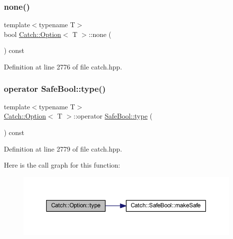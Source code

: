 \subsubsection{\texorpdfstring{none()}{none()}}
{\footnotesize\ttfamily template$<$typename T$>$ \\
bool \hyperlink{class_catch_1_1_option}{Catch\+::\+Option}$<$ T $>$\+::none (\begin{DoxyParamCaption}{ }\end{DoxyParamCaption}) const\hspace{0.3cm}{\ttfamily [inline]}}



Definition at line 2776 of file catch.\+hpp.

\hypertarget{class_catch_1_1_option_a8ed8de7b072f893c85df14913dbbe197}{}\label{class_catch_1_1_option_a8ed8de7b072f893c85df14913dbbe197} 
\subsubsection{\texorpdfstring{operator Safe\+Bool\+::type()}{operator SafeBool::type()}}
{\footnotesize\ttfamily template$<$typename T$>$ \\
\hyperlink{class_catch_1_1_option}{Catch\+::\+Option}$<$ T $>$\+::operator \hyperlink{class_catch_1_1_safe_bool_a39eef9baed296299d625a54d54a2a958}{Safe\+Bool\+::type} (\begin{DoxyParamCaption}{ }\end{DoxyParamCaption}) const\hspace{0.3cm}{\ttfamily [inline]}}



Definition at line 2779 of file catch.\+hpp.

Here is the call graph for this function\+:\nopagebreak
\begin{figure}[H]
\begin{center}
\leavevmode
\includegraphics[width=350pt]{class_catch_1_1_option_a8ed8de7b072f893c85df14913dbbe197_cgraph}
\end{center}
\end{figure}
\hypertarget{class_catch_1_1_option_a96dccb86bdf45ee0c08e122b6133bef3}{}\label{class_catch_1_1_option_a96dccb86bdf45ee0c08e122b6133bef3} 
